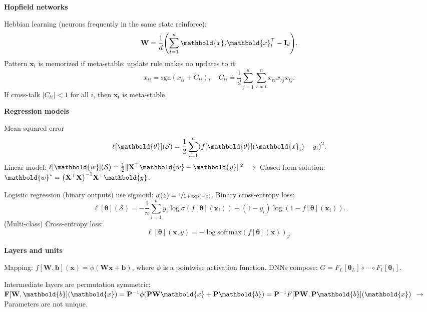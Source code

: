 \documentclass[10pt]{article}
\newenvironment{topic}[1]
{\textbf{\sffamily \footnotesize \colorbox{black}{\rlap{\textbf{\textcolor{white}{#1}}}\hspace{\linewidth}\hspace{-2\fboxsep}}}}
{}
\newenvironment{subtopic}[1]
{\vspace{0.1cm} \begin{center}\textbf{\footnotesize \sffamily #1}\end{center}}
{}
\renewcommand{\mat}[1]{\ensuremath{\mathbf{#1}}}
\renewcommand{\vec}[1]{\ensuremath{\mathbold{#1}}}
\begin{document}
\begin{multicols*}{3}
\begin{topic}{Connectionism}
\begin{subtopic}{Hopfield networks}
            Hebbian learning (neurons frequently in the same state reinforce): \[
                \mat{W} = \frac{1}{d} \lft( \sum_{t=1}^{n} \vec{x}_t \transpose{\vec{x}_t} - \mat{I}_d \rgt).
            \]
            Pattern $\vec{x}_t$ is memorized if meta-stable: update rule makes no updates to it: \[
                x_{ti} = \mathrm{sgn}(x_{ti} + C_{ti}), \quad C_{ti} \doteq \frac{1}{d} \sum_{j=1}^{d} \sum_{r\neq t}^{n} x_{ri}x_{rj}x_{tj}.
            \]
            If cross-talk $|C_{ti}| < 1$ for all $i$, then $\vec{x}_t$ is meta-stable.
        \end{subtopic}

    \end{topic}

    \begin{topic}{Feedforward networks}

        \begin{subtopic}{Regression models}
            Mean-squared error \[
                \ell[\vec{\theta}](\mathcal{S}) = \frac{1}{2} \sum_{i=1}^{n} \lft( f[\vec{\theta}](\vec{x}_i) - y_i \rgt)^2.
            \]
            Linear model: $\ell[\vec{w}](\mathcal{S}) = \frac{1}{2} \| \transpose{\mat{X}} \vec{w} - \vec{y}
                \|^2$ $\to$ Closed form solution: $\vec{w}^\star = \inv{\lft( \transpose{\mat{X}}\mat{X}
                    \rgt)}\transpose{\mat{X}} \vec{y}$.

            Logistic regression (binary outputs) use sigmoid: $\sigma(z) \doteq \nicefrac{1}{1 + \exp(-z)}$.
            Binary cross-entropy loss: \[
                \ell[\vec{\theta}](\mathcal{S}) = -\frac{1}{n} \sum_{i=1}^{n} y_i \log \sigma(f[\vec{\theta}](\vec{x}_i)) + (1-y_i)\log(1-f[\vec{\theta}](\vec{x}_i)).
            \] (Multi-class) Cross-entropy loss: \[
                \ell[\vec{\theta}](\vec{x},y) = -\log \mathrm{softmax}(f[\vec{\theta}](\vec{x}))_y.
            \]
        \end{subtopic}

        \begin{subtopic}{Layers and units}
            Mapping: $f[\mat{W},\vec{b}](\vec{x}) = \phi(\mat{W}\vec{x}+\vec{b})$, where $\phi$ is a pointwise activation function. DNNs compose: $G = F_L[\vec{\theta}_L] \circ \cdots \circ F_1[\vec{\theta}_1]$.

            Intermediate layers are permutation symmetric: $\mat{F}[\mat{W},\vec{b}](\vec{x}) = \inv{\mat{P}}
                \phi(\mat{P}\mat{W}\vec{x} + \mat{P}\vec{b}) = \inv{\mat{P}} F[\mat{P} \mat{W},
                        \mat{P}\vec{b}](\vec{x})$ $\to$ Parameters are not unique.
        \end{subtopic}


\end{topic}
\end{multicols*}
\end{document}
